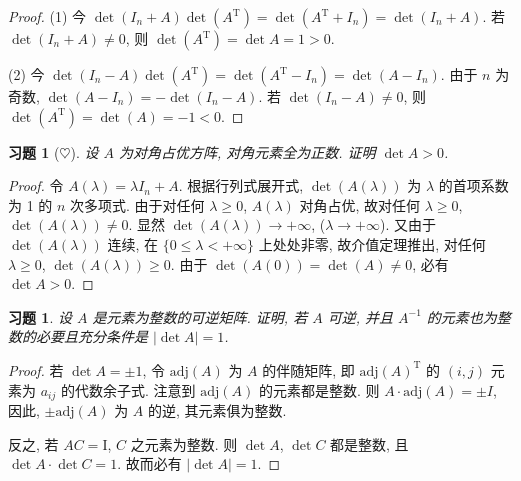 \documentclass[UTF8]{ctexart}
\newtheorem{ex}[thm]{习题}
\begin{document}
\begin{proof}
  (1) 今 \(\det(I_n+A)\det(A^{\mathrm{T}}) = \det(A^{\mathrm{T}}+I_n)=\det(I_n+A)\).
  若 \(\det(I_n +A)\neq 0\), 则 \(\det(A^{\mathrm{T}})=\det A = 1 > 0\).

  (2)   今 \(\det(I_n -A) \det(A^{\mathrm{T}})=\det(A^{\mathrm{T}}-I_n)=\det(A-I_n)\).
  由于 \(n\) 为奇数, \(\det(A-I_n)=-\det(I_n-A)\). 若 \(\det(I_n-A)\neq 0\),
  则 \(\det(A^{\mathrm{T}})=\det(A)=-1<0\).
\end{proof}

\begin{ex}[\(\heartsuit\)]
  设 \(A\) 为对角占优方阵, 对角元素全为正数. 证明 \(\det A > 0\).
\end{ex}

\begin{proof}
  令 \(A(\lambda) = \lambda I_n + A\).
  根据行列式展开式, \(\det(A(\lambda))\) 为 \(\lambda\) 的首项系数为 1 的 \(n\) 次多项式.
  由于对任何 \(\lambda \geq 0\), \(A(\lambda)\) 对角占优,
  故对任何 \(\lambda \geq 0\), \(\det (A(\lambda)) \neq 0\).
  显然 \(\det(A(\lambda)) \to +\infty\), (\(\lambda\to +\infty\)).
  又由于 \(\det(A(\lambda))\) 连续, 在 \(\{0\leq \lambda < +\infty\}\)
  上处处非零, 故介值定理推出, 对任何 \(\lambda \geq 0\),
  \(\det(A(\lambda))\geq 0\). 由于 \(\det(A(0))=\det(A)\neq 0\),
  必有 \(\det A > 0\).
\end{proof}

\begin{ex}
  设 \(A\) 是元素为整数的可逆矩阵. 证明, 若 \(A\) 可逆, 并且 \(A^{-1}\)
  的元素也为整数的必要且充分条件是 \(|\det A| =  1\).
\end{ex}

\begin{proof}

  若 \(\det A = \pm 1\),
  令 \(\mathrm{adj}(A)\) 为 \(A\) 的伴随矩阵,
  即 \(\mathrm{adj}(A)^{\mathrm{T}}\) 的 \((i,j)\) 元素为 \(a_{ij}\)
  的代数余子式.
  注意到 \(\mathrm{adj}(A)\) 的元素都是整数.
  则 \(A \cdot \mathrm{adj}(A) = \pm I\), 因此, \(\pm\mathrm{adj}(A)\)
  为 \(A\) 的逆, 其元素俱为整数.

  反之, 若 \(AC = \mathrm{I}\), \(C\) 之元素为整数. 则 \(\det A\), \(\det C\)
  都是整数, 且
  \(\det A \cdot \det C = 1\). 故而必有 \(|\det A| = 1\).
\end{proof}
\end{document}
